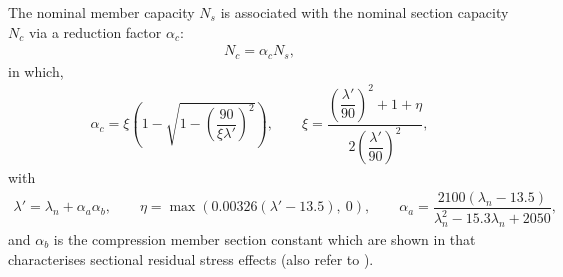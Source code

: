 The nominal member capacity $N_s$ is associated with the nominal section capacity $N_c$ via a reduction factor $\alpha_c$:
\begin{gather}
N_c=\alpha_cN_s,
\end{gather}
in which,
\begin{gather*}
\alpha_c=\xi\left(1-\sqrt{1-\left(\dfrac{90}{\xi\lambda'}\right)^2}\right),\qquad
\xi=\dfrac{\left(\dfrac{\lambda'}{90}\right)^2+1+\eta}{2\left(\dfrac{\lambda'}{90}\right)^2},
\end{gather*}
with
\begin{gather*}
\lambda'=\lambda_n+\alpha_a\alpha_b,\qquad
\eta=\max\left(0.00326\left(\lambda'-13.5\right),~0\right),\qquad
\alpha_a=\dfrac{2100\left(\lambda_n-13.5\right)}{\lambda_n^2-15.3\lambda_n+2050},
\end{gather*}
and $\alpha_b$ is the compression member section constant which are shown in  that characterises sectional residual stress effects (also refer to ).
